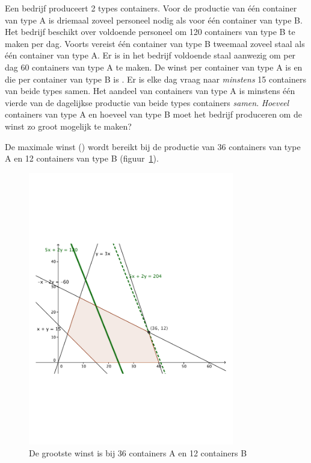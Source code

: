      
\begin{oef}
Een bedrijf produceert 2 types containers.
     Voor de productie van 
    \'{e}\'{e}n container van type A is driemaal zoveel personeel 
    nodig als voor \'{e}\'{e}n container van type B. Het bedrijf 
    beschikt over voldoende personeel om 120 containers van type B te 
    maken per dag. Voorts vereist \'{e}\'{e}n container van type B 
    tweemaal zoveel staal als \'{e}\'{e}n container van type A. Er is 
    in het bedrijf voldoende staal aanwezig om per dag 60 containers 
    van type A te maken. De winst per container van type A is  
    en die per container van type B is . Er is elke dag 
    vraag naar \emph{minstens} 15 containers van beide types samen. Het 
    aandeel van containers van type A is minstens \'{e}\'{e}n  vierde 
    van de dagelijkse productie van beide types containers \emph{samen}. 
    \emph{Hoeveel} containers van type A en hoeveel van type B moet 
    het bedrijf produceren om de winst zo groot mogelijk te maken?
    \begin{opl}
    De maximale winst () wordt bereikt bij de productie van 36 containers van type A en 12 containers van type B (figuur~\ref{fig:containersAB}).
            \begin{figure}[hbtp]
\centering
\includegraphics[width=0.8\textwidth]{oefeningen/FigurenLP/OefcontainersAB.pdf}
\caption{De grootste winst is bij 36 containers A en 12 containers B}
\label{fig:containersAB}
\end{figure}
    \end{opl}
\end{oef}

